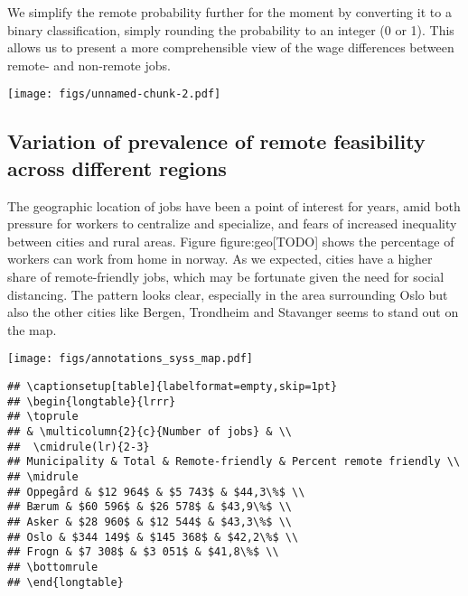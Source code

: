 \documentclass[11pt,]{article}
\begin{document}
We simplify the remote probability further for the moment by converting
it to a binary classification, simply rounding the probability to an
integer (0 or 1). This allows us to present a more comprehensible view
of the wage differences between remote- and non-remote jobs.

\texttt{[image: figs/unnamed-chunk-2.pdf]}

\hypertarget{variation-of-prevalence-of-remote-feasibility-across-different-regions}{%
\subsection{Variation of prevalence of remote feasibility across
different
regions}\label{variation-of-prevalence-of-remote-feasibility-across-different-regions}}

The geographic location of jobs have been a point of interest for years,
amid both pressure for workers to centralize and specialize, and fears
of increased inequality between cities and rural areas. Figure
figure:geo{[}TODO{]} shows the percentage of workers can work from home
in norway. As we expected, cities have a higher share of remote-friendly
jobs, which may be fortunate given the need for social distancing. The
pattern looks clear, especially in the area surrounding Oslo but also
the other cities like Bergen, Trondheim and Stavanger seems to stand out
on the map.

\texttt{[image: figs/annotations\_syss\_map.pdf]}

\begin{verbatim}
## \captionsetup[table]{labelformat=empty,skip=1pt}
## \begin{longtable}{lrrr}
## \toprule
## & \multicolumn{2}{c}{Number of jobs} & \\ 
##  \cmidrule(lr){2-3}
## Municipality & Total & Remote-friendly & Percent remote friendly \\ 
## \midrule
## Oppegård & $12 964$ & $5 743$ & $44,3\%$ \\ 
## Bærum & $60 596$ & $26 578$ & $43,9\%$ \\ 
## Asker & $28 960$ & $12 544$ & $43,3\%$ \\ 
## Oslo & $344 149$ & $145 368$ & $42,2\%$ \\ 
## Frogn & $7 308$ & $3 051$ & $41,8\%$ \\ 
## \bottomrule
## \end{longtable}
\end{verbatim}
\end{document}
